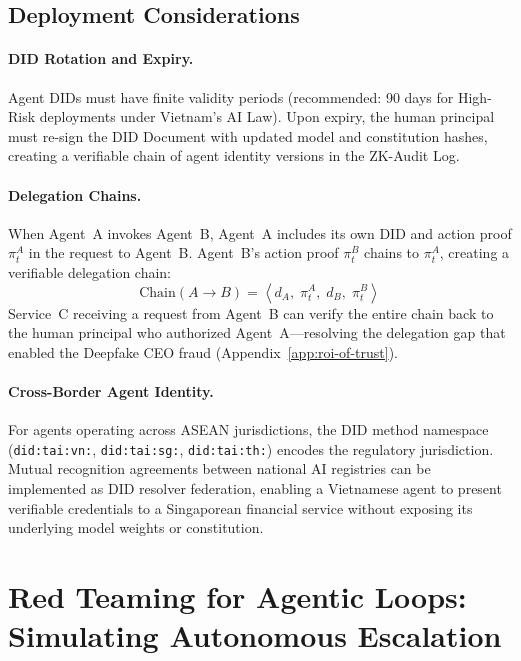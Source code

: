 \subsection{Deployment Considerations}
\label{subsec:did-deployment}

\paragraph{DID Rotation and Expiry.}
Agent DIDs must have finite validity periods (recommended:
90 days for High-Risk deployments under Vietnam's AI Law).
Upon expiry, the human principal must re-sign the DID Document
with updated model and constitution hashes, creating a
verifiable chain of agent identity versions in the ZK-Audit
Log.

\paragraph{Delegation Chains.}
When Agent~A invokes Agent~B, Agent~A includes its own DID
and action proof $\pi_t^A$ in the request to Agent~B.
Agent~B's action proof $\pi_t^B$ chains to $\pi_t^A$,
creating a verifiable delegation chain:
\begin{equation}
  \label{eq:did-chain}
  \mathrm{Chain}(A \to B)
    = \left\langle
        d_A,\; \pi_t^A,\; d_B,\; \pi_t^B
      \right\rangle
\end{equation}
Service~C receiving a request from Agent~B can verify the
entire chain back to the human principal who authorized
Agent~A---resolving the delegation gap that enabled the
Deepfake CEO fraud
(Appendix~\ref{app:roi-of-trust}).

\paragraph{Cross-Border Agent Identity.}
For agents operating across ASEAN jurisdictions, the DID
method namespace (\texttt{did:tai:vn:}, \texttt{did:tai:sg:},
\texttt{did:tai:th:}) encodes the regulatory jurisdiction.
Mutual recognition agreements between national AI registries
can be implemented as DID resolver federation, enabling
a Vietnamese agent to present verifiable credentials to a
Singaporean financial service without exposing its underlying
model weights or constitution.

\section{Red Teaming for Agentic Loops: Simulating Autonomous Escalation}
\label{sec:red-teaming}

